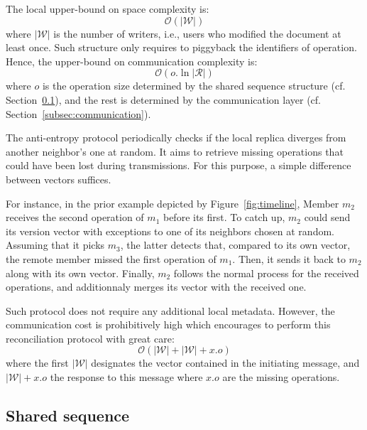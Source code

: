 \begin{asparadesc}
  The local upper-bound on space complexity is:
  \begin{equation}
    \mathcal{O}(|\mathcal{W}|)
  \end{equation}
  where $|\mathcal{W}|$ is the number of writers, i.e., users who modified the
  document at least once.  Such structure only requires to piggyback the
  identifiers of operation. Hence, the upper-bound on communication complexity
  is:
  \begin{equation}
    \mathcal{O}(o.\ln |\mathcal{R}|)
  \end{equation}
  where $o$ is the operation size determined by the shared sequence structure
  (cf. Section~\ref{subsec:sequence}), and the rest is determined by the
  communication layer (cf. Section~\ref{subsec:communication}).
  
\item [The anti-entropy protocol] periodically checks if the local replica
  diverges from another neighbor's one at random. It aims to retrieve missing
  operations that could have been lost during transmissions. For this purpose, a
  simple difference between vectors suffices.

  For instance, in the prior example depicted by Figure~\ref{fig:timeline},
  Member $m_2$ receives the second operation of $m_1$ before its first. To catch
  up, $m_2$ could send its version vector with exceptions to one of its
  neighbors chosen at random. Assuming that it picks $m_3$, the latter detects
  that, compared to its own vector, the remote member missed the first operation
  of $m_1$. Then, it sends it back to $m_2$ along with its own vector. Finally,
  $m_2$ follows the normal process for the received operations, and additionnaly
  merges its vector with the received one.

  Such protocol does not require any additional local metadata. However, the
  communication cost is prohibitively high which encourages to perform this
  reconciliation protocol with great care:
  \begin{equation}
    \mathcal{O}(|\mathcal{W}|+|\mathcal{W}|+x.o)
  \end{equation}
  where the first $|\mathcal{W}|$ designates the vector contained in the
  initiating message, and $|\mathcal{W}|+x.o$ the response to this message where
  $x.o$ are the missing operations.
\end{asparadesc}

\subsection{Shared sequence}
\label{subsec:sequence}

